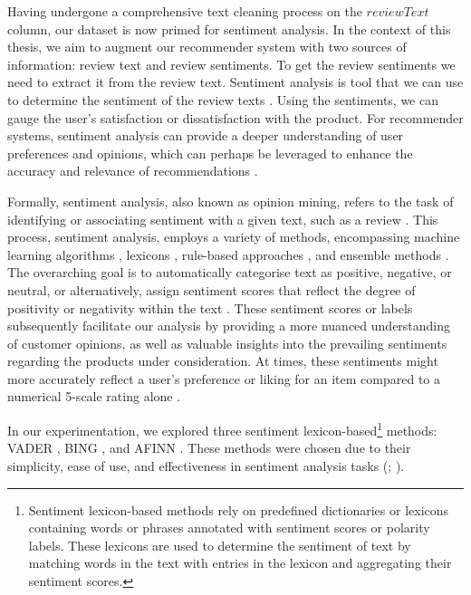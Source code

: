 Having undergone a comprehensive text cleaning process on the $reviewText$ column, our dataset is now primed for sentiment analysis. In the context of this thesis, we aim to augment our recommender system with two sources of information: review text and review sentiments. To get the review sentiments we need to extract it from the review text. Sentiment analysis is tool that we can use to determine the sentiment of the review texts \cite{shen2019sentiment}. Using the sentiments, we can  gauge the user's satisfaction or dissatisfaction with the product. For recommender systems, sentiment analysis can provide a deeper understanding of user preferences and opinions, which can perhaps be leveraged to enhance the accuracy and relevance of recommendations \cite{chen2015recommender}. 

Formally, sentiment analysis, also known as opinion mining, refers to the task of identifying or associating sentiment with a given text, such as a review \cite{medhat2014sentiment}. This process, sentiment analysis, employs a variety of methods, encompassing machine learning algorithms \cite{agarwal2016machine}, lexicons \cite{taboada2011lexicon}, rule-based approaches  \cite{hutto2014vader}, and ensemble methods \cite{kazmaier2022power}. The overarching goal is to automatically categorise text as positive, negative, or neutral, or alternatively, assign sentiment scores that reflect the degree of positivity or negativity within the text \cite{medhat2014sentiment}. These sentiment scores or labels subsequently facilitate our analysis by providing a more nuanced understanding of customer opinions, as well as valuable insights into the prevailing sentiments regarding the products under consideration. At times, these sentiments might more accurately reflect a user's preference or liking for an item compared to a numerical 5-scale rating alone \cite{chen2015augmenting}. 

In our experimentation, we explored three sentiment lexicon-based\footnote{Sentiment lexicon-based methods rely on predefined dictionaries or lexicons containing words or phrases annotated with sentiment scores or polarity labels. These lexicons are used to determine the sentiment of text by matching words in the text with entries in the lexicon and aggregating their sentiment scores.} methods: VADER \cite{hutto2014vader}, BING \cite{hu2004mining}, and AFINN \cite{nielsen2011new}. These methods were chosen due to their simplicity, ease of use, and effectiveness in sentiment analysis tasks (\cite{taboada2011lexicon}; \cite{hutto2014vader}). 


